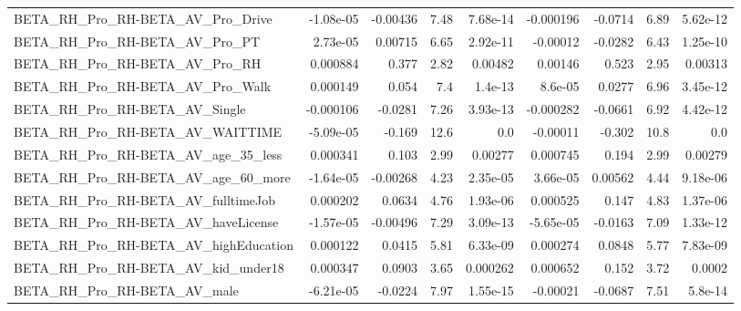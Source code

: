 \begin{tabular}{lrrrrrrrr}
BETA\_RH\_Pro\_RH-BETA\_AV\_Pro\_Drive                   &   -1.08e-05 &     -0.00436 &      7.48 & 7.68e-14 &  -0.000196 &     -0.0714 &         6.89 &      5.62e-12 \\
BETA\_RH\_Pro\_RH-BETA\_AV\_Pro\_PT                      &    2.73e-05 &      0.00715 &      6.65 & 2.92e-11 &   -0.00012 &     -0.0282 &         6.43 &      1.25e-10 \\
BETA\_RH\_Pro\_RH-BETA\_AV\_Pro\_RH                      &    0.000884 &        0.377 &      2.82 &  0.00482 &    0.00146 &       0.523 &         2.95 &       0.00313 \\
BETA\_RH\_Pro\_RH-BETA\_AV\_Pro\_Walk                    &    0.000149 &        0.054 &       7.4 &  1.4e-13 &    8.6e-05 &      0.0277 &         6.96 &      3.45e-12 \\
BETA\_RH\_Pro\_RH-BETA\_AV\_Single                      &   -0.000106 &      -0.0281 &      7.26 & 3.93e-13 &  -0.000282 &     -0.0661 &         6.92 &      4.42e-12 \\
BETA\_RH\_Pro\_RH-BETA\_AV\_WAITTIME                    &   -5.09e-05 &       -0.169 &      12.6 &      0.0 &   -0.00011 &      -0.302 &         10.8 &           0.0 \\
BETA\_RH\_Pro\_RH-BETA\_AV\_age\_35\_less                 &    0.000341 &        0.103 &      2.99 &  0.00277 &   0.000745 &       0.194 &         2.99 &       0.00279 \\
BETA\_RH\_Pro\_RH-BETA\_AV\_age\_60\_more                 &   -1.64e-05 &     -0.00268 &      4.23 & 2.35e-05 &   3.66e-05 &     0.00562 &         4.44 &      9.18e-06 \\
BETA\_RH\_Pro\_RH-BETA\_AV\_fulltimeJob                 &    0.000202 &       0.0634 &      4.76 & 1.93e-06 &   0.000525 &       0.147 &         4.83 &      1.37e-06 \\
BETA\_RH\_Pro\_RH-BETA\_AV\_haveLicense                 &   -1.57e-05 &     -0.00496 &      7.29 & 3.09e-13 &  -5.65e-05 &     -0.0163 &         7.09 &      1.33e-12 \\
BETA\_RH\_Pro\_RH-BETA\_AV\_highEducation               &    0.000122 &       0.0415 &      5.81 & 6.33e-09 &   0.000274 &      0.0848 &         5.77 &      7.83e-09 \\
BETA\_RH\_Pro\_RH-BETA\_AV\_kid\_under18                 &    0.000347 &       0.0903 &      3.65 & 0.000262 &   0.000652 &       0.152 &         3.72 &        0.0002 \\
BETA\_RH\_Pro\_RH-BETA\_AV\_male                        &   -6.21e-05 &      -0.0224 &      7.97 & 1.55e-15 &   -0.00021 &     -0.0687 &         7.51 &       5.8e-14 \\

\end{tabular}
